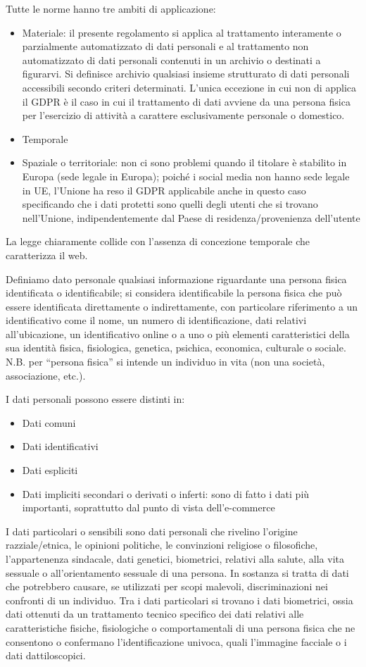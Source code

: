 Tutte le norme hanno tre ambiti di applicazione:
\begin{itemize}
    \item Materiale: il presente regolamento si applica al trattamento interamente o parzialmente automatizzato di dati personali e al trattamento non automatizzato di dati personali contenuti in un archivio o destinati a figurarvi. Si definisce archivio qualsiasi insieme strutturato di dati personali accessibili secondo criteri determinati. L'unica eccezione in cui non di applica il GDPR è il caso in cui il trattamento di dati avviene da una persona fisica per l'esercizio di attività a carattere esclusivamente personale o domestico. 
    \item Temporale
    \item Spaziale o territoriale: non ci sono problemi quando il titolare è stabilito in Europa (sede legale in Europa); poiché i social media non hanno sede legale in UE, l'Unione ha reso il GDPR applicabile anche in questo caso specificando che i dati protetti sono quelli degli utenti che si trovano nell'Unione, indipendentemente dal Paese di residenza/provenienza dell'utente
\end{itemize}
La legge chiaramente collide con l'assenza di concezione temporale che caratterizza il web. 

Definiamo dato personale qualsiasi informazione riguardante una persona fisica identificata o identificabile; si considera identificabile la persona fisica che può essere identificata direttamente o indirettamente, con particolare riferimento a un identificativo come il nome, un numero di identificazione, dati relativi all'ubicazione, un identificativo online o a uno o più elementi caratteristici della sua identità fisica, fisiologica, genetica, psichica, economica, culturale o sociale.
N.B. per ``persona fisica'' si intende un individuo in vita (non una società, associazione, etc.).

I dati personali possono essere distinti in:
\begin{itemize}
    \item Dati comuni
    \item Dati identificativi
    \item Dati espliciti
    \item Dati impliciti secondari o derivati o inferti: sono di fatto i dati più importanti, soprattutto dal punto di vista dell'e-commerce
\end{itemize}

I dati particolari o sensibili sono dati personali che rivelino l'origine razziale/etnica, le opinioni politiche, le convinzioni religiose o filosofiche, l'appartenenza sindacale, dati genetici, biometrici, relativi alla salute, alla vita sessuale o all'orientamento sessuale di una persona. In sostanza si tratta di dati che potrebbero causare, se utilizzati per scopi malevoli, discriminazioni nei confronti di un individuo. 
Tra i dati particolari si trovano i dati biometrici, ossia dati ottenuti da un trattamento tecnico specifico dei dati relativi alle caratteristiche fisiche, fisiologiche o comportamentali di una persona fisica che ne consentono o confermano l'identificazione univoca, quali l'immagine facciale o i dati dattiloscopici. 

